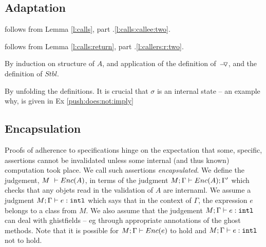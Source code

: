 \completeProof

\subsection{Adaptation}
\label{appendix:adaptation}
 


 follows from Lemma \ref{l:calls}, part .\ref{l:calls:callee:two}.
\completeProofSub
 
 follows from Lemma \ref{l:calls:return}, part .\ref{l:callers:r:two}.
\completeProofSub
% 
% 
%



By induction on structure of $A$, and application of  the definition of $ { } \!-\!\!\!\,\!{\triangledown} { } $, and the definition of $Stbl$.
\completeProofSub

By unfolding the definitions. It is crucial that $\sigma$ is an internal state -- an example why, is given in Ex \ref{push:does:not:imply}
\completeProofSub


\subsection{Encapsulation}

{
Proofs of adherence to {\SpecLang specifications  hinge on the expectation that some, 
specific, assertions cannot be invalidated unless some 
} internal (and thus known) computation took place. 
{We call such assertions   \emph{encapsulated}.}
}
We define the  judgement,  $M\ \vdash  {\ensuremath Enc( A )}$, in terms of the judgment  $M; \Gamma \vdash {\ensuremath Enc( A )}  ; \Gamma'$
which checks that any objets read  in the validation of $A$ are internaml.
We assume a judgment $M; \Gamma \vdash e :  \mbox{\normalfont{\texttt{intl}}}$ which says that in the context of $\Gamma$, the expression $e$ belongs to a class from $M$.
We also assume that the judgement $M; \Gamma \vdash e :  \mbox{\normalfont{\texttt{intl}}}$ can deal with ghistfields -- eg through appropriate annotations of the ghost methods.
Note that it is possible for $M; \Gamma \vdash {\ensuremath Enc( e )}$ to hold and 
$M; \Gamma \vdash  e : \mbox{\normalfont{\texttt{intl}}}$ not to hold.


